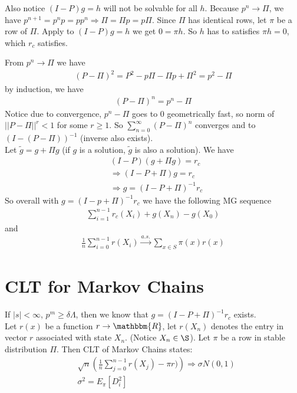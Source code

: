 Also notice $(I-P)g = h$ will not be solvable for all $h$. Because $p^n \to \Pi$, we have $p^{n+1} = p^np = pp^n \Rightarrow \Pi = \Pi p = p \Pi$. Since $\Pi$ has identical rows, let $\pi$ be a row of $\Pi$. Apply to $(I-P)g=h$ we get $0 = \pi h$. So $h$ has to satisfies $\pi h = 0$, which $r_c$ satisfies. 

From $p^n \to \Pi$ we have 
    \begin{align*}
        (P-\Pi)^2 = P^2 - p\Pi - \Pi p + \Pi^2 = p^2 - \Pi
    \end{align*}
by induction, we have 
    \begin{align*}
        (P-\Pi)^n = p^n - \Pi
    \end{align*}
Notice due to convergence, $p^n - \Pi$ goes to 0 geometrically fast, so norm of $||P-\Pi||^r < 1$ for some $r \geq 1$. So $\sum_{n=0}^\infty (P-\Pi)^n$ converges and to $(I - (P-\Pi))^{-1}$ (inverse also exists). \\

Let $\tilde{g} = g + \Pi g$ (if $g$ is a solution, $\tilde{g}$ is also a solution). We have 
    \begin{align*}
        & (I-P)(g + \Pi g) = r_c \\
        & \Longrightarrow (I - P + \Pi)g = r_c \\
        & \Longrightarrow g = (I - P + \Pi)^{-1}r_c
    \end{align*}
So overall with $g = ( I - p + \Pi)^{-1} r_c$ we have the following MG sequence
    \begin{align*}
        \sum_{i=1}^{n-1} r_c(X_i) + g(X_n) - g(X_0)
    \end{align*}
and 
    \begin{align*}
        \frac{1}{n} \sum_{i=0}^{n-1} r(X_i) \overset{a.s.}{\to} \sum_{x\in S} \pi(x) r(x)
    \end{align*}
    
    
\section{CLT for Markov Chains} 
If $|s| < \infty$, $p^m \geq \delta \Lambda$, then we know that $g=(I-P+\Pi)^{-1} r_c$ exists. \\
Let $r(x)$ be a function $r\to \mathbbm{R}$, let $r(X_n)$ denotes the entry in vector $r$ associated with state $X_n$. (Notice $X_n \in \S$). Let $\pi$ be a row in stable distribution $\Pi$.  Then CLT of Markov Chains states: 
    \begin{align*}
        & \sqrt{n} \left( \frac{1}{n}\sum_{j=0}^{n-1} r(X_j) - \pi r) \right) \Rightarrow \sigma N(0,1)\\
        & \sigma^2 = E_\pi[D_i^2]
    \end{align*}
    
